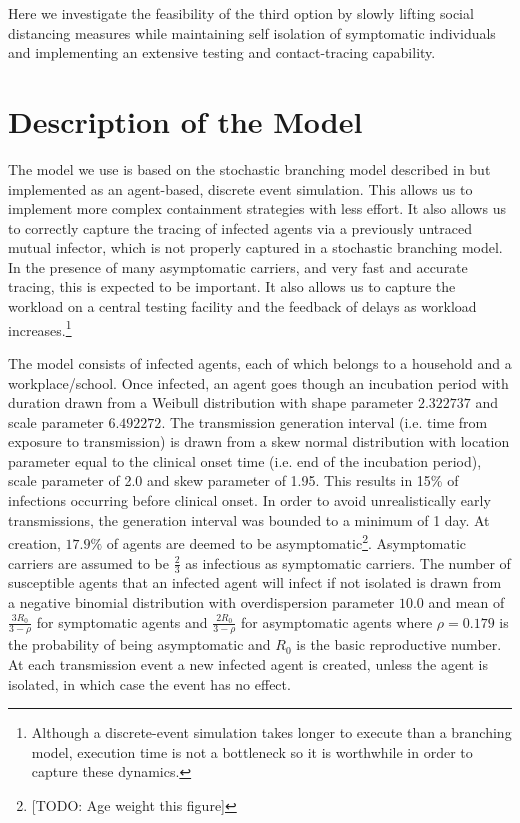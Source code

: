 \documentclass{article}
\begin{document}
Here we investigate the feasibility of the third option by slowly lifting social distancing measures while maintaining self isolation of symptomatic individuals and implementing an extensive testing and contact-tracing capability.

\section{Description of the Model}

The model we use is based on the stochastic branching model described in \cite{hellewellfeasibility} but implemented as an agent-based, discrete event simulation. This allows us to implement more complex containment strategies with less effort. It also allows us to correctly capture the tracing of infected agents via a previously untraced mutual infector, which is not properly captured in a stochastic branching model. In the presence of many asymptomatic carriers, and very fast and accurate tracing, this is expected to be important. It also allows us to capture the workload on a central testing facility and the feedback of delays as workload increases.\footnote{Although a discrete-event simulation takes longer to execute than a branching model, execution time is not a bottleneck so it is worthwhile in order to capture these dynamics.} 

The model consists of infected agents, each of which belongs to a household and a workplace/school. Once infected, an agent goes though an incubation period with duration drawn from a Weibull distribution with shape parameter $2.322737$ and scale parameter $6.492272$\cite{backer2020incubation}. The transmission generation interval (i.e. time from exposure to transmission) is drawn from a skew normal distribution with location parameter equal to the clinical onset time (i.e. end of the incubation period), scale parameter of 2.0 and skew parameter of 1.95\cite{hellewellfeasibility}. This results in 15\% of infections occurring before clinical onset\cite{hellewellfeasibility}. In order to avoid unrealistically early transmissions, the generation interval was bounded to a minimum of 1 day. At creation, $17.9\%$ of agents are deemed to be asymptomatic\cite{:/content/10.2807/1560-7917.ES.2020.25.10.2000180}\footnote{[TODO: Age weight this figure]}. Asymptomatic carriers are assumed to be $\frac{2}{3}$ as infectious as symptomatic carriers\cite{ferguson2020impact}. The number of susceptible agents that an infected agent will infect if not isolated is drawn from a negative binomial distribution with overdispersion parameter $10.0$\cite{zhuang2020preliminary}\cite{riou2020pattern} and mean of $\frac{3R_0}{3 - \rho}$ for symptomatic agents and $\frac{2R_0}{3 - \rho}$ for asymptomatic agents where $\rho=0.179$ is the probability of being asymptomatic and $R_0$ is the basic reproductive number. At each transmission event a new infected agent is created, unless the agent is isolated, in which case the event has no effect.
\end{document}
